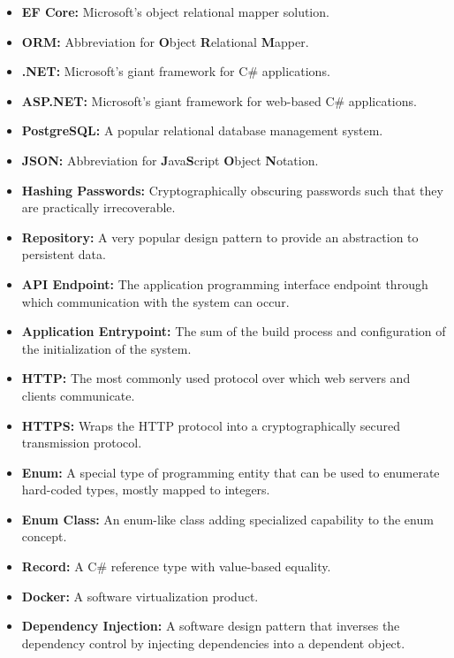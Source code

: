 \documentclass[a4paper, 12pt, titlepage]{article}
\begin{document}
  \begin{itemize}
    \item \textbf{EF Core:} Microsoft's object relational mapper solution.
    \item \textbf{ORM:} Abbreviation for \textbf{O}bject \textbf{R}elational \textbf{M}apper.
    \item \textbf{.NET:} Microsoft's giant framework for C\# applications.
    \item \textbf{ASP.NET:} Microsoft's giant framework for web-based C\# applications.
    \item \textbf{PostgreSQL:} A popular relational database management system.
    \item \textbf{JSON:} Abbreviation for \textbf{J}ava\textbf{S}cript \textbf{O}bject \textbf{N}otation.
    \item \textbf{Hashing Passwords:} Cryptographically obscuring passwords such that they are practically irrecoverable.
    \item \textbf{Repository:} A very popular design pattern to provide an abstraction to persistent data.
    \item \textbf{API Endpoint:} The application programming interface endpoint through which communication with the system can occur.
    \item \textbf{Application Entrypoint:} The sum of the build process and configuration of the initialization of the system.
    \item \textbf{HTTP:} The most commonly used protocol over which web servers and clients communicate.
    \item \textbf{HTTPS:} Wraps the HTTP protocol into a cryptographically secured transmission protocol.
    \item \textbf{Enum:} A special type of programming entity that can be used to enumerate hard-coded types, mostly mapped to integers.
    \item \textbf{Enum Class:} An enum-like class adding specialized capability to the enum concept.
    \item \textbf{Record:} A C\# reference type with value-based equality.
    \item \textbf{Docker:} A software virtualization product.
    \item \textbf{Dependency Injection:} A software design pattern that inverses the dependency control by injecting dependencies into a dependent object.
  \end{itemize}
\end{document}

